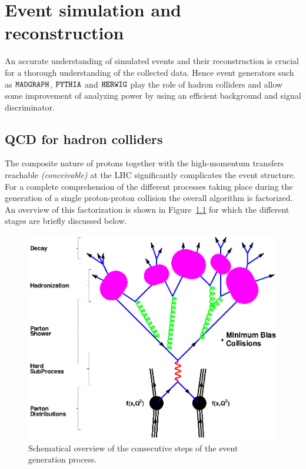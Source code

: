 \chapter{Event simulation and reconstruction} \label{chp:labelTitle}

An accurate understanding of simulated events and their reconstruction is crucial for a thorough understanding of the collected data. Hence event generators such as $\texttt{MADGRAPH}$, $\texttt{PYTHIA}$ and $\texttt{HERWIG}$ play the role of hadron colliders and allow some improvement of analyzing power by using an efficient background and signal discriminator.

\section{QCD for hadron colliders} \label{sec::QCDHadron}

The composite nature of protons together with the high-momentum transfers reachable \textit{(conceivable)} at the LHC significantly complicates the event structure. 
For a complete comprehension of the different processes taking place during the generation of a single proton-proton collision the overall algorithm is factorized.
An overview of this factorization is shown in Figure~\ref{fig::EvtShower} for which the different stages are briefly discussed below.

\begin{figure}[htb]
 \centering
 \includegraphics[width = 0.8 \textwidth]{Chapters/Chapter3/Figures/f_shg_event.eps}
 \caption{Schematical overview of the consecutive steps of the event generation process.}  \label{fig::EvtShower}
\end{figure}


